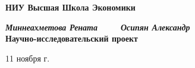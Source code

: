 
\begin{titlepage}
\begin{center}

\textbf{НИУ Высшая Школа Экономики}

\vspace{35mm}

\textbf{\textit{ Миннеахметова Рената \ \ \ \ Осипян Александр}} \\[8mm]

\textbf{\Huge Научно-исследовательский проект}\\[3mm]
\textbf{\textit{\large }}






\vfill 


\par{11 ноября \the\year{} г.}
\end{center}
\end{titlepage}
\restoregeometry
\addtocounter{page}{1}
